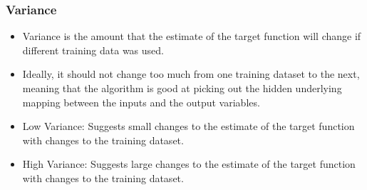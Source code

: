 \begin{frame}[fragile]\frametitle{Variance }

\begin{itemize}
\item Variance is the amount that the estimate of the target function will change if different training data was used.
\item  Ideally, it should not change too much from one training dataset to the next, meaning that the algorithm is good at picking out the hidden underlying mapping between the inputs and the output variables.
\item 
    Low Variance: Suggests small changes to the estimate of the target function with changes to the training dataset.
    \item 
    High Variance: Suggests large changes to the estimate of the target function with changes to the training dataset.

\end{itemize}
\end{frame}








